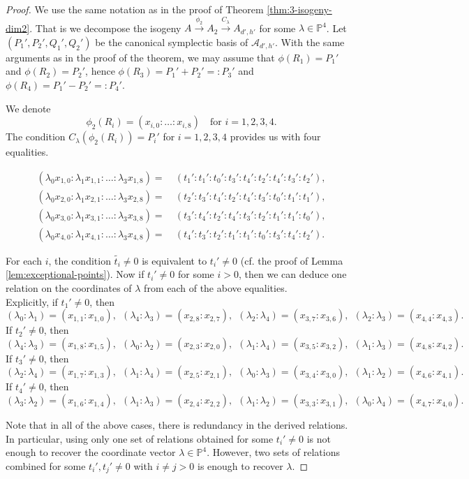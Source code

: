 \documentclass[10pt,a4paper]{amsart}
\newcommand{\A}{\mathcal{A}}
\newcommand{\PP}{\mathbb{P}}
\begin{document}
\begin{proof}
	We use the same notation as in the proof of Theorem \ref{thm:3-isogeny-dim2}. That is we decompose the isogeny $A \xrightarrow{\phi_2} A_2 \xrightarrow{C_\lambda} A_{d',h'}$ for some $\lambda \in \PP^4$. Let $(P_1',P_2',Q_1',Q_2')$ be the canonical symplectic basis of $\A_{d',h'}$. With the same arguments as in the proof of the theorem, we may assume that $\phi(R_1) = P_1'$ and $\phi(R_2)=P_2'$, hence $\phi(R_3) = P_1'+P_2' =: P_3'$ and $\phi(R_4) = P_1'-P_2' =:P_4'$.
	
	
	We denote
	\[
	\phi_2(R_i) = (x_{i,0}:\dots: x_{i,8}) \quad \text{for } i =1,2,3,4.
	\]
	The condition $C_\lambda(\phi_2(R_i)) = P_i'$ for $i = 1,2,3,4$ provides us with four equalities. 
	
	\begin{align*}
		\left(\lambda_0 x_{1,0}: \lambda_1 x_{1,1} : \dots: \lambda_3 x_{1,8}\right) = &~
		(t_1' : t_1' : t_0':  t_3': t_4' : t_2' :  t_4' : t_3' : t_2'),\\
		\left(\lambda_0 x_{2,0}: \lambda_1 x_{2,1} : \dots: \lambda_3 x_{2,8}\right)  = &~
		(t_2': t_3' : t_4' : t_2' : t_4' : t_3 ': t_0' : t_1' : t_1' ),\\
		\left(\lambda_0 x_{3,0}: \lambda_1 x_{3,1} : \dots: \lambda_3 x_{3,8}\right)  = &~
		(t_3': t_4' : t_2' : t_4' : t_3' : t_2 ': t_1' : t_1' : t_0' ),\\
		\left(\lambda_0 x_{4,0}: \lambda_1 x_{4,1} : \dots: \lambda_3 x_{4,8}\right)  = &~
		(t_4': t_3' : t_2' : t_1' : t_1' : t_0 ': t_3' : t_4' : t_2' ).
	\end{align*}
	
	For each $i$, the condition $\tilde{t_i} \neq0$ is equivalent to $t_i' \neq 0$ (cf. the proof of Lemma \ref{lem:exceptional-points}). Now if $t_i'\neq 0$ for some $i>0$, then we can deduce one relation on the coordinates of $\lambda$ from each of the above equalities.\\
	Explicitly, if $t_1' \neq 0$, then
	\[
	(\lambda_0:\lambda_1) = (x_{1,1}:x_{1,0}), ~~
	(\lambda_4:\lambda_3) = (x_{2,8}:x_{2,7}), ~~
	(\lambda_2:\lambda_4) = (x_{3,7}:x_{3,6}), ~~
	(\lambda_2:\lambda_3) = (x_{4,4} : x_{4,3}).
	\]
	If $t_2' \neq 0$, then
	\[
	(\lambda_4:\lambda_3) = (x_{1,8}:x_{1,5}), ~~
	(\lambda_0:\lambda_2) = (x_{2,3}:x_{2,0}), ~~
	(\lambda_1:\lambda_4) = (x_{3,5}:x_{3,2}), ~~
	(\lambda_1:\lambda_3) = (x_{4,8} : x_{4,2}).
	\]
	If $t_3' \neq 0$, then
	\[
	(\lambda_2:\lambda_4) = (x_{1,7}:x_{1,3}), ~~
	(\lambda_1:\lambda_4) = (x_{2,5}:x_{2,1}), ~~
	(\lambda_0:\lambda_3) = (x_{3,4}:x_{3,0}), ~~
	(\lambda_1:\lambda_2) = (x_{4,6} : x_{4,1}).
	\]
	If $t_4' \neq 0$, then
	\[
	(\lambda_3:\lambda_2) = (x_{1,6}:x_{1,4}), ~~
	(\lambda_1:\lambda_3) = (x_{2,4}:x_{2,2}), ~~
	(\lambda_1:\lambda_2) = (x_{3,3}:x_{3,1}), ~~
	(\lambda_0:\lambda_4) = (x_{4,7} : x_{4,0}).
	\]
	
	Note that in all of the above cases, there is redundancy in the derived relations. In particular, using only one set of relations obtained for some $t_i' \neq 0$ is not enough to recover the coordinate vector $\lambda \in \PP^4$. However, two sets of relations combined for some $t_i',t_j' \neq 0$ with $i\neq j > 0$ is enough to recover $\lambda$. 
\end{proof}
\end{document}
